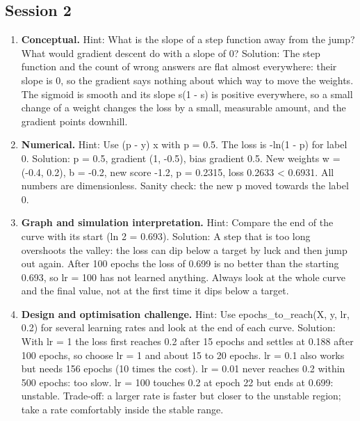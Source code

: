 \documentclass[11pt,a4paper]{article}
\begin{document}
\subsection*{Session 2}
\begin{enumerate}[nosep]
\item \textbf{Conceptual.} Hint: What is the slope of a step function away from the jump? What would gradient descent do with a slope of 0? Solution: The step function and the count of wrong answers are flat almost everywhere: their slope is 0, so the gradient says nothing about which way to move the weights. The sigmoid is smooth and its slope s(1 - s) is positive everywhere, so a small change of a weight changes the loss by a small, measurable amount, and the gradient points downhill.
\item \textbf{Numerical.} Hint: Use (p - y) x with p = 0.5. The loss is -ln(1 - p) for label 0. Solution: p = 0.5, gradient (1, -0.5), bias gradient 0.5. New weights w = (-0.4, 0.2), b = -0.2, new score -1.2, p = 0.2315, loss 0.2633 \textless{} 0.6931. All numbers are dimensionless. Sanity check: the new p moved towards the label 0.
\item \textbf{Graph and simulation interpretation.} Hint: Compare the end of the curve with its start (ln 2 = 0.693). Solution: A step that is too long overshoots the valley: the loss can dip below a target by luck and then jump out again. After 100 epochs the loss of 0.699 is no better than the starting 0.693, so lr = 100 has not learned anything. Always look at the whole curve and the final value, not at the first time it dips below a target.
\item \textbf{Design and optimisation challenge.} Hint: Use epochs\_to\_reach(X, y, lr, 0.2) for several learning rates and look at the end of each curve. Solution: With lr = 1 the loss first reaches 0.2 after 15 epochs and settles at 0.188 after 100 epochs, so choose lr = 1 and about 15 to 20 epochs. lr = 0.1 also works but needs 156 epochs (10 times the cost). lr = 0.01 never reaches 0.2 within 500 epochs: too slow. lr = 100 touches 0.2 at epoch 22 but ends at 0.699: unstable. Trade-off: a larger rate is faster but closer to the unstable region; take a rate comfortably inside the stable range.
\end{enumerate}
\end{document}
